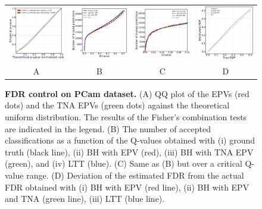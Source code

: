 \documentclass{article}
\begin{document}
\begin{figure}
	\advance\leftskip-0.5cm
	\begin{tabular}{cccc}
 		\includegraphics[width=1.7in]{img/cnn_QQ_pcam.pdf} &
		\includegraphics[width=1.7in]{img/cnn_pcam_fdr_control.pdf} & 
        \includegraphics[width=1.7in]{img/cnn_pcam_fdr_control_loc.pdf} &
        \includegraphics[width=1.7in]{img/cnn_FDPscat_pcam.pdf}
		\\	
		A & B & C & D
	\end{tabular}
	\caption{{\bf FDR control on PCam dataset.} (A) QQ plot of the EPVs (red dots) and the TNA EPVs (green dots) against the theoretical uniform distribution. The results of the Fisher's combination tests are indicated in the legend. (B) The number of accepted classifications as a function of the Q-values obtained with (i) ground truth (black line), (ii) BH with EPV (red), (iii) BH with TNA EPV (green), and (iv) LTT (blue). (C) Same as (B) but over a critical Q-value range. (D) Deviation of the estimated FDR from the actual FDR obtained with (i) BH with EPV (red line), (ii) BH with EPV and TNA (green line), (iii) LTT (blue line).}
	\label{fig:pcam}
\end{figure} 
\end{document}
